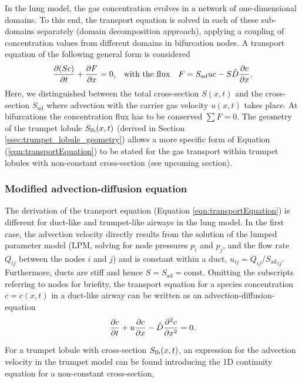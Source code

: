 In the lung model, the gas concentration evolves in a network of one-dimensional domains.
To this end, the transport equation is solved in each of these sub-domains separately (domain decomposition approach), applying a coupling of concentration values from different domains in bifurcation nodes.
A transport equation of the following general form is considered
\begin{equation} \label{eqn:transportEquation}
\frac{\partial (Sc)}{\partial t} + \frac{\partial F}{\partial x} = 0\text{,} \quad\text{with the flux}\quad F = S_\mathrm{ad} u c - S\hat{D}\frac{\partial c}{\partial x} \text{.}
\end{equation}
Here, we distinguished between the total cross-section $S(x,t)$ and the cross-section $S_\mathrm{ad}$ where advection with the carrier gas velocity $u(x,t)$ takes place.
At bifurcations the concentration flux has to be conserved $\sum F = 0$.
The geometry of the trumpet lobule $S_{\mathrm{lb}}(x,t)$ (derived in Section \ref{ssec:trumpet_lobule_geometry}) allows a more specific form of Equation (\ref{eqn:transportEquation}) to be stated for the gas transport within trumpet lobules with non-constant cross-section (see upcoming section).


\subsubsection{Modified advection-diffusion equation} \label{ssec:modified_advection_diffusion_equation}
The derivation of the transport equation (Equation \ref{eqn:transportEquation}) is different for duct-like and trumpet-like airways in the lung model.
In the first case, the advection velocity directly results from the solution of the lumped parameter model (LPM, solving for node pressures $p_i$ and $p_j$, and the flow rate $Q_{ij}$ between the nodes $i$ and $j$) and is constant within a duct, $u_{ij} = Q_{ij}/{S_\mathrm{ad}}_{ij}$.
Furthermore, ducts are stiff and hence $S = S_\mathrm{ad} = \text{const}$.
Omitting the subscripts referring to nodes for briefity, the transport equation for a species concentration $c = c(x,t)$ in a duct-like airway can be written as an advection-diffusion-equation
\begin{equation} \label{eqn:advectionDiffusionDuct}
\frac{\partial c}{\partial t} + u\frac{\partial c}{\partial x} - \hat{D}\frac{\partial^2 c}{\partial x^2} = 0 \text{.}
\end{equation}


For a trumpet lobule with cross-section $S_{\mathrm{lb}}(x,t)$, an expression for the advection velocity in the trumpet model can be found introducing the 1D continuity equation for a non-constant cross-section,

